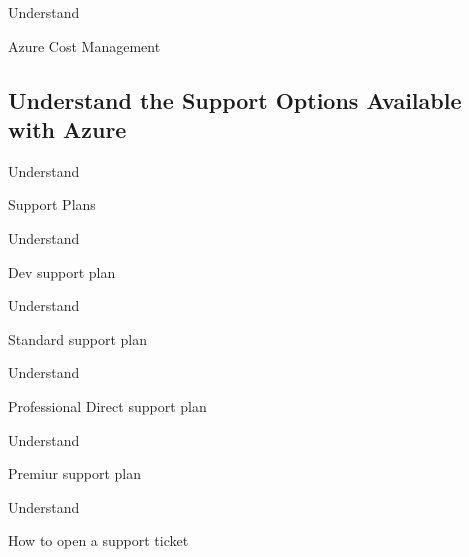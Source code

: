 \documentclass{scrartcl}
\newenvironment{flashcard}[2][]{%
    #1
    \vfill
    \centerline{\Large{#2}}
    \vfill
    \newpage
}
{\newpage}
\newcommand{\subsectioncard}[1]{
    \vspace*{\stretch{1}}
    \subsection{#1}
    \vspace*{\stretch{1}}
    \pagebreak
}
\begin{document}
    \begin{flashcard}[Understand]{Azure Cost Management}

    \end{flashcard}

    \subsectioncard{Understand the Support Options Available with Azure}

    \begin{flashcard}[Understand]{Support Plans}

    \end{flashcard}

    \begin{flashcard}[Understand]{Dev support plan}

    \end{flashcard}

    \begin{flashcard}[Understand]{Standard support plan}

    \end{flashcard}

    \begin{flashcard}[Understand]{Professional Direct support plan}

    \end{flashcard}

    \begin{flashcard}[Understand]{Premiur support plan}

    \end{flashcard}

    \begin{flashcard}[Understand]{How to open a support ticket}

    \end{flashcard}
\end{document}
